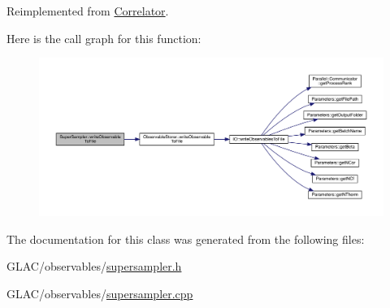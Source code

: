 Reimplemented from \mbox{\hyperlink{class_correlator_a9e8d80e30e4fbe3b7fe57521538cb5ff}{Correlator}}.

Here is the call graph for this function\+:\nopagebreak
\begin{figure}[H]
\begin{center}
\leavevmode
\includegraphics[width=350pt]{class_super_sampler_a05b42b82879233dc329d280a61bfd7f0_cgraph}
\end{center}
\end{figure}


The documentation for this class was generated from the following files\+:\begin{DoxyCompactItemize}
\item 
G\+L\+A\+C/observables/\mbox{\hyperlink{supersampler_8h}{supersampler.\+h}}\item 
G\+L\+A\+C/observables/\mbox{\hyperlink{supersampler_8cpp}{supersampler.\+cpp}}\end{DoxyCompactItemize}
